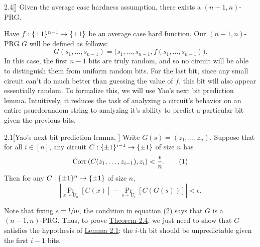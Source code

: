 \documentclass[11pt]{article}
\begin{document}
\begin{theorem}{2.4}[\cite{NW94}]\label{t-2-4}
    Given the average case hardness assumption, there exists a $(n - 1, n)$-PRG.
\end{theorem}
\noindent
Have $f : \{\pm 1\}^{n - 1} \rightarrow \{\pm 1\}$ be an average case hard function. Our $(n - 1, n)$-PRG $G$ will be defined as follows:
\begin{equation*}
    G(s_1, \ldots, s_{n - 1}) = \bigl(s_1, \ldots, s_{n - 1}, f(s_1, \ldots, s_{n - 1})\bigr).
\end{equation*}
In this case, the first $n - 1$ bits are truly random, and so no circuit will be able to distinguish them from uniform random bits. For the last bit, since any small circuit can't do much better than guessing the value of $f$, this bit will also appear essentially random. To formalize this, we will use Yao's next bit prediction lemma. Intuitively, it reduces the task of analyzing a circuit's behavior on an entire psuedorandom string to analyzing it's ability to predict a particular bit given the previous bits.
\begin{lemma}{2.1}[Yao's next bit prediction lemma, \cite{Yao82}]\label{l-2-1}
    Write $G(s) = (z_1, \ldots, z_n)$. Suppose that for all $i \in [n]$, any circuit $C : \{\pm 1\}^{i - 1} \rightarrow \{\pm 1\}$ of size $n$ has 
    \begin{equation*}
        \mathrm{Corr}\left(C(z_1, \ldots, z_{i - 1}), z_i\right) < \frac{\epsilon}{n}. \tag{1}
    \end{equation*}
    Then for any $C : \{\pm 1\}^n \rightarrow \{\pm 1\}$ of size $n$, 
    \begin{equation*}
        \left|\Pr_{x \backsim U_n}[C(x)] - \Pr_{s \backsim U_\ell}[C(G(s))]\right| < \epsilon. \tag{2}
    \end{equation*}
\end{lemma}
Note that fixing $\epsilon = \sfrac{1}{10}$, the condition in equation (2) says that $G$ is a $(n - 1, n)$-PRG. Thus, to prove  \hyperref[t-2-4]{Theorem 2.4}, we just need to show that $G$ satisfies the hypothesis of \hyperref[l-2-1]{Lemma 2.1}: the $i$-th bit should be unpredictable given the first $i - 1$ bits.
\end{document}
